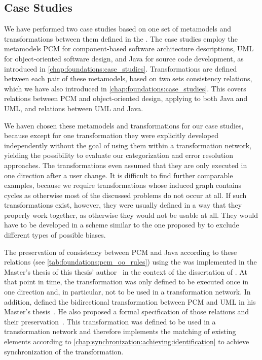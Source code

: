 \subsection{Case Studies}
\label{chap:correctness_evaluation:categorization:case_studies}

We have performed two case studies based on one set of metamodels and transformations between them defined in the \reactionslanguage.
The case studies employ the metamodels \gls{PCM} for component-based software architecture descriptions, \gls{UML} for object-oriented software design, and Java for source code development, as introduced in \autoref{chap:foundations:case_studies}.
Transformations are defined between each pair of these metamodels, based on two sets consistency relations, which we have also introduced in \autoref{chap:foundations:case_studies}.
This covers relations between \gls{PCM} and object-oriented design, applying to both Java and \gls{UML}, and relations between \gls{UML} and Java.

We haven chosen these metamodels and transformations for our case studies, because except for one transformation they were explicitly developed independently without the goal of using them within a transformation network, yielding the possibility to evaluate our categorization and error resolution approaches.
The transformations even assumed that they are only executed in one direction after a user change.
It is difficult to find further comparable examples, because we require transformations whose induced graph contains cycles as otherwise most of the discussed problems do not occur at all.
If such transformations exist, however, they were usually defined in a way that they properly work together, as otherwise they would not be usable at all.
They would have to be developed in a scheme similar to the one proposed by \textcite{kramer2016c} to exclude different types of possible biases.

The preservation of consistency between \gls{PCM} and Java according to these relations (see \autoref{tab:foundations:pcm_oo_rules}) using the \reactionslanguage was implemented in the Master's thesis of this thesis' author~\cite{klare2016b} in the context of the dissertation of \textcite{langhammer2017a}.
At that point in time, the transformation was only defined to be executed once in one direction and, in particular, not to be used in a transformation network.
In addition, \citeauthor{syma2018ma} defined the bidirectional transformation between \gls{PCM} and \gls{UML} in his Master's thesis~\cite{syma2018ma}.
He also proposed a formal specification of those relations and their preservation~\cite[Section 5]{syma2018ma}.
This transformation was defined to be used in a transformation network and therefore implements the matching of existing elements according to \autoref{chap:synchronization:achieving:identification} to achieve synchronization of the transformation.


